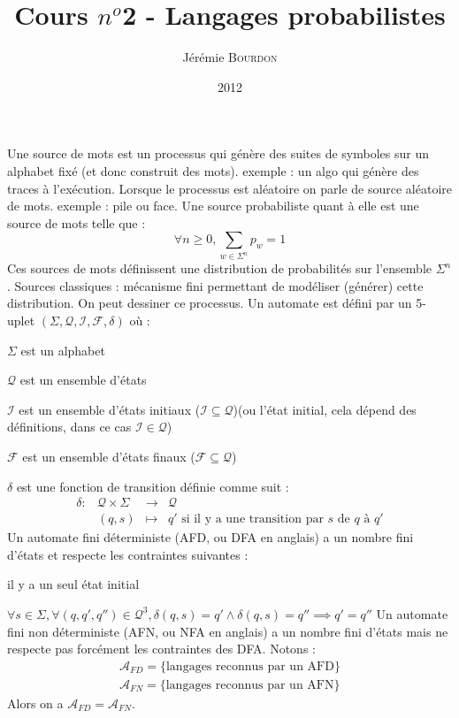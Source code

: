 \documentclass[a4paper,11pt]{article}
\begin{document}
\title{Cours $n^o$2 - Langages probabilistes}
\author{Jérémie \textsc{Bourdon}}
\date{2012}
\maketitle
{}
 \p Une source de mots est un processus qui génère des suites de symboles sur un
 alphabet fixé (et donc construit des mots).
 \p exemple : un algo qui génère des traces à l'exécution.
 \p Lorsque le processus est aléatoire on parle de source aléatoire de mots.
 \p exemple : pile ou face.
 \p Une source probabiliste quant à elle est une source de mots telle que :
 \[
 \forall n \geq 0, \sum_{w \in \Sigma^n}p_w = 1
 \]
 \p Ces sources de mots définissent une distribution de probabilités sur
 l'ensemble $\Sigma^n$.
 \p Sources classiques : mécanisme fini permettant de modéliser (générer) cette
 distribution.
 \p On peut dessiner ce processus.
 \p Un automate est défini par un 5-uplet
 $(\Sigma, \mathcal{Q}, \mathcal{I}, \mathcal{F}, \delta)$ où :\\
 \bi
  \item $\Sigma$ est un alphabet
  \item $\mathcal{Q}$ est un ensemble d'états
  \item $\mathcal{I}$ est un ensemble d'états initiaux
  ($\mathcal{I} \subseteq \mathcal{Q}$)(ou l'état
  initial, cela dépend des définitions, dans ce cas $\mathcal{I} \in \mathcal{Q}$)
  \item $\mathcal{F}$ est un ensemble d'états finaux
  ($\mathcal{F} \subseteq \mathcal{Q}$)
  \item $\delta$ est une fonction de transition définie comme suit :
  \[
  \begin{array}{llll}
   \delta : & \mathcal{Q} \times \Sigma & \to     & \mathcal{Q} \\
            & (q, s)                    & \mapsto & q'\text{ si il y a une
              transition par }s\text{ de }q\text{ à }q'
  \end{array}
  \]
 \ei
  \p Un automate fini déterministe (AFD, ou DFA en anglais) a un nombre fini
  d'états et respecte les contraintes suivantes :
  \bi
   \item il y a un seul état initial
   \item $\forall s \in \Sigma, \forall (q, q', q'') \in \mathcal{Q}^3,
   \delta(q, s) = q' \land \delta(q, s) = q'' \implies q' = q''$
  \ei
  \p Un automate fini non déterministe (AFN, ou NFA en anglais) a un nombre fini
  d'états mais ne respecte pas forcément les contraintes des DFA.
  \p Notons :
  \[
  \begin{array}{l}
  \mathcal{A}_{FD} = \{\text{langages reconnus par un AFD}\} \\
  \mathcal{A}_{FN} = \{\text{langages reconnus par un AFN}\}
  \end{array}
  \]
  \p Alors on a $\mathcal{A}_{FD} = \mathcal{A}_{FN}$.
 
\end{document}
